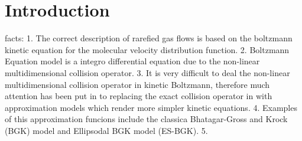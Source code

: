 \documentclass[11pt,a4paper]{article}
\begin{document}
\section{Introduction}
facts:
1. The correct description of rarefied gas flows is based on the boltzmann kinetic equation for the molecular velocity distribution function. 
2. Boltzmann Equation model is a integro differential equation due to the non-linear multidimensional collision operator.  
3. It is very difficult to deal the non-linear multidimensional collision operator in kinetic Boltzmann, therefore much attention has been put in to replacing the exact collision operator in with approximation models which render more simpler kinetic equations. 
4. Examples of this approximation funcions include the classica Bhatagar-Gross and Krock (BGK) model and Ellipsodal BGK model (ES-BGK). 
5. 
\end{document}
